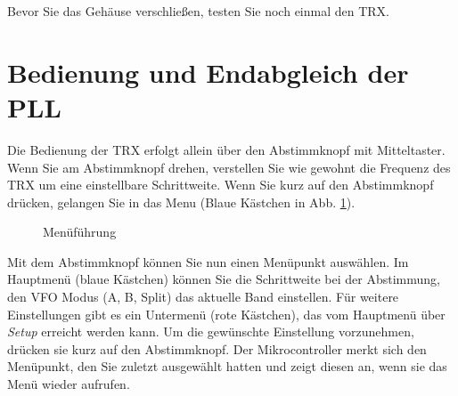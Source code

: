 \documentclass[10pt, a4paper]{paper}
\newcommand{\warn}[1]{{\color{red} #1}}
\begin{document}
\warn{Bevor Sie das Gehäuse verschließen, testen Sie noch einmal den TRX.}

\clearpage
\section{Bedienung und Endabgleich der PLL} \label{sec:user}
Die Bedienung der TRX erfolgt allein über den Abstimmknopf mit Mitteltaster. Wenn Sie am Abstimmknopf drehen, verstellen Sie wie gewohnt die Frequenz des TRX um eine einstellbare Schrittweite. Wenn Sie kurz auf den Abstimmknopf drücken, gelangen Sie in das Menu (Blaue Kästchen in Abb. \ref{fig:menu}). 

\begin{figure}[!h!]
 \centering
 \footnotesize
 \caption{Menüführung} \label{fig:menu}
\end{figure}

Mit dem Abstimmknopf können Sie nun einen Menüpunkt auswählen. Im Hauptmenü (blaue Kästchen) können Sie die Schrittweite bei der Abstimmung, den VFO Modus (A, B, Split) das aktuelle Band einstellen. Für weitere Einstellungen gibt es ein Untermenü (rote Kästchen), das vom Hauptmenü über \emph{Setup} erreicht werden kann. Um die gewünschte Einstellung vorzunehmen, drücken sie kurz auf den Abstimmknopf. Der Mikrocontroller merkt sich den Menüpunkt, den Sie zuletzt ausgewählt hatten und zeigt diesen an, wenn sie das Menü wieder aufrufen.
\end{document}
